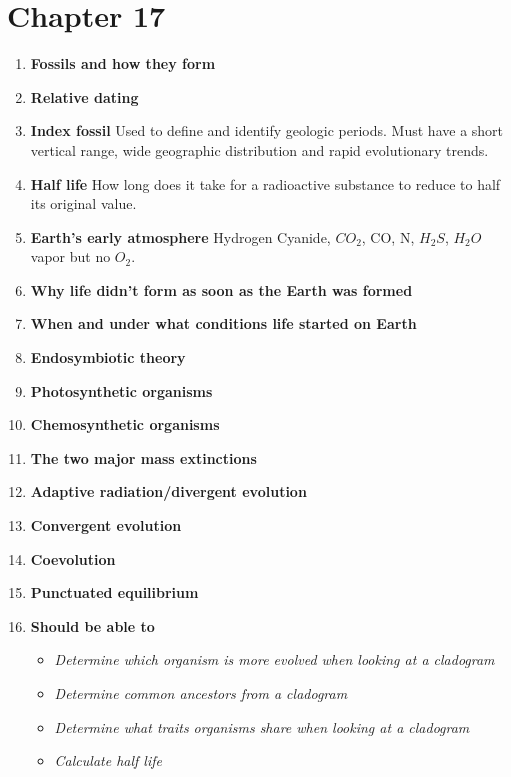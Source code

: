 \documentclass[9pt]{article}
\begin{document}
\section*{Chapter 17}
\begin{enumerate}
  \item {\bf Fossils and how they form}
  \item {\bf Relative dating}
  \item {\bf Index fossil} Used to define and identify geologic
    periods. Must have a short vertical range, wide geographic
    distribution and rapid evolutionary trends.
  \item  {\bf Half  life}  How long  does it  take  for a  radioactive
    substance to reduce to half its original value.
  \item {\bf Earth's early atmosphere} Hydrogen Cyanide, $CO_2$, CO, N,
    $H_2S$, $H_2O$ vapor but no $O_2$.
  \item {\bf Why life didn't form as soon as the Earth was formed}
  \item {\bf When and under what conditions life started on Earth}
  \item {\bf Endosymbiotic theory}
  \item {\bf Photosynthetic organisms}
  \item {\bf Chemosynthetic organisms}
  \item {\bf The two major mass extinctions}
  \item {\bf Adaptive radiation/divergent evolution}
  \item {\bf Convergent evolution}
  \item {\bf Coevolution}
  \item {\bf Punctuated equilibrium}
  \item {\bf Should be able to}
    \begin{itemize}
      \item {\em Determine which organism is more evolved when looking at a cladogram}
      \item {\em Determine common ancestors from a cladogram}
      \item {\em Determine what traits organisms share when looking at a cladogram}
      \item {\em Calculate half life}
    \end{itemize}
\end{enumerate}
\end{document}
